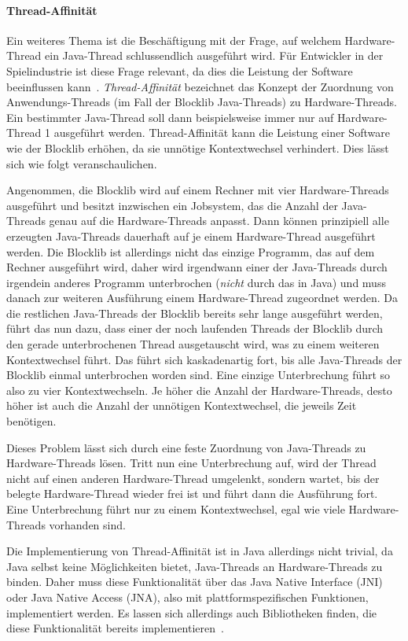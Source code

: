 \paragraph{Thread-Affinität}
Ein weiteres Thema ist die Beschäftigung mit der Frage, auf welchem Hardware-Thread ein Java-Thread schlussendlich ausgeführt wird. Für Entwickler in der Spielindustrie ist diese Frage relevant, da dies die Leistung der Software beeinflussen kann~\cite{Gyrling2015}. \emph{Thread-Affinität} bezeichnet das Konzept der Zuordnung von Anwendungs-Threads (im Fall der Blocklib Java-Threads) zu Hardware-Threads. Ein bestimmter Java-Thread soll dann beispielsweise immer nur auf Hardware-Thread 1 ausgeführt werden. Thread-Affinität kann die Leistung einer Software wie der Blocklib erhöhen, da sie unnötige Kontextwechsel verhindert. Dies lässt sich wie folgt veranschaulichen.

Angenommen, die Blocklib wird auf einem Rechner mit vier Hardware-Threads ausgeführt und besitzt inzwischen ein Jobsystem, das die Anzahl der Java-Threads genau auf die Hardware-Threads anpasst. Dann können prinzipiell alle erzeugten Java-Threads dauerhaft auf je einem Hardware-Thread ausgeführt werden. Die Blocklib ist allerdings nicht das einzige Programm, das auf dem Rechner ausgeführt wird, daher wird irgendwann einer der Java-Threads durch irgendein anderes Programm unterbrochen (\emph{nicht} durch das  in Java) und muss danach zur weiteren Ausführung einem Hardware-Thread zugeordnet werden. Da die restlichen Java-Threads der Blocklib bereits sehr lange ausgeführt werden, führt das nun dazu, dass einer der noch laufenden Threads der Blocklib durch den gerade unterbrochenen Thread ausgetauscht wird, was zu einem weiteren Kontextwechsel führt. Das führt sich kaskadenartig fort, bis alle Java-Threads der Blocklib einmal unterbrochen worden sind. Eine einzige Unterbrechung führt so also zu vier Kontextwechseln. Je höher die Anzahl der Hardware-Threads, desto höher ist auch die Anzahl der unnötigen Kontextwechsel, die jeweils Zeit benötigen.

Dieses Problem lässt sich durch eine feste Zuordnung von Java-Threads zu Hardware-Threads lösen. Tritt nun eine Unterbrechung auf, wird der Thread nicht auf einen anderen Hardware-Thread umgelenkt, sondern wartet, bis der belegte Hardware-Thread wieder frei ist und führt dann die Ausführung fort. Eine Unterbrechung führt nur zu einem Kontextwechsel, egal wie viele Hardware-Threads vorhanden sind.

Die Implementierung von Thread-Affinität ist in Java allerdings nicht trivial, da Java selbst keine Möglichkeiten bietet, Java-Threads an Hardware-Threads zu binden. Daher muss diese Funktionalität über das Java Native Interface (JNI) oder Java Native Access (JNA), also mit plattformspezifischen Funktionen, implementiert werden. Es lassen sich allerdings auch Bibliotheken finden, die diese Funktionalität bereits implementieren~\cite{ChronicleSoftware,Cheremin2011}.